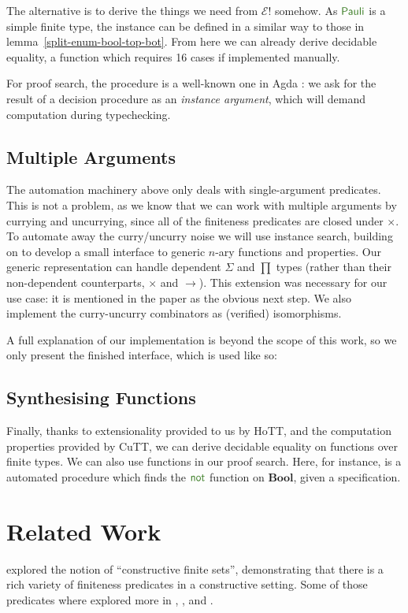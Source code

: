 The alternative is to derive the things we need from \(\mathcal{E}!\) somehow.
As \(\AgdaDatatype{Pauli}\) is a simple finite type, the instance can be defined
in a similar way to those in lemma~\ref{split-enum-bool-top-bot}.
From here we can already derive decidable equality, a function which requires 16
cases if implemented manually.

For proof search, the procedure is a well-known one in Agda
\cite{devrieseBrightSideType2011}: we ask for the result of a decision procedure
as an \emph{instance argument}, which will demand computation during
typechecking.
\subsection{Multiple Arguments}
The automation machinery above only deals with single-argument predicates.
This is not a problem, as we know that we can work with multiple arguments by
currying and uncurrying, since all of the finiteness predicates are closed under
\(\times\).
To automate away the curry/uncurry noise we will use instance search, building
on \cite{allaisGenericLevelPolymorphic2019} to develop a small interface to
generic \(n\)-ary functions and properties.
Our generic representation can handle dependent \(\Sigma\) and \(\prod\)
types (rather than their non-dependent counterparts, \(\times\) and
\(\rightarrow\)).
This extension was necessary for our use case: it is mentioned in the paper
as the obvious next step. 
We also implement the curry-uncurry combinators as (verified) isomorphisms.

A full explanation of our implementation is beyond the scope of this work, so we
only present the finished interface, which is used like so:
\subsection{Synthesising Functions}
Finally, thanks to extensionality provided to us by HoTT, and the computation
properties provided by CuTT, we can derive decidable equality on functions over
finite types.
We can also use functions in our proof search.
Here, for instance, is a automated procedure which finds the
\(\AgdaFunction{not}\) function on \(\mathbf{Bool}\), given a specification.
\section{Related Work}
\cite{spiwackConstructivelyFinite2010} explored the notion of ``constructive
finite sets'', demonstrating that there is a rich variety of finiteness
predicates in a constructive setting.
Some of those predicates where explored more in
\cite{firsovVariationsNoetherianness2016a},
\cite{parmannInvestigatingStreamlessSets2015}, and
\cite{uustaluFinitenessRationalSequences2017a}.

